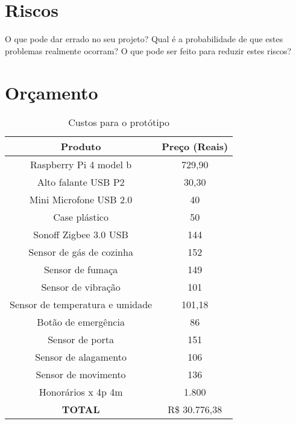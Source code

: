 \documentclass{acm_proc_article-sp}
\begin{document}
\section{Riscos}

O que pode dar errado no seu projeto?
Qual é a probabilidade de que estes problemas realmente ocorram?
O que pode ser feito para reduzir estes riscos?



\section{Orçamento}

\begin{table}[!h]
\ABNTEXfontereduzida
\centering
\caption{Custos para o protótipo}
\begin{tabular}{cc}
\hline
\textbf{Produto}                & \textbf{Preço (Reais)} \\ \hline
Raspberry Pi 4 model b          & 729,90                 \\
Alto falante USB P2             & 30,30                  \\
Mini Microfone USB 2.0          & 40                     \\
Case plástico                   & 50                     \\
Sonoff Zigbee 3.0 USB           & 144                    \\
Sensor de gás de cozinha        & 152                    \\
Sensor de fumaça                & 149                    \\
Sensor de vibração              & 101                    \\
Sensor de temperatura e umidade & 101,18                 \\
Botão de emergência             & 86                     \\
Sensor de porta                 & 151                    \\
Sensor de alagamento            & 106                    \\
Sensor de movimento             & 136                    \\
Honorários x 4p 4m              & 1.800                   \\ \hline
\textbf{TOTAL}                  & R\$ 30.776,38           \\ \hline
\end{tabular}
\fonteproprioautor

\end{table}
\end{document}
